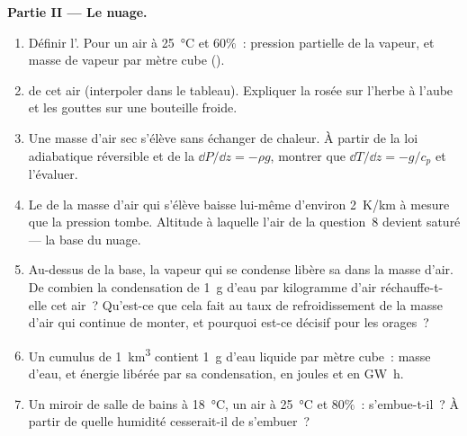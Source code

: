 \begin{problem}
\medskip
\noindent\textbf{Partie II --- Le nuage.}
\begin{enumerate}[resume]
  \item Définir l'. Pour un air à \qty{25}{\degreeCelsius} et $60\%$~:
        pression partielle de la vapeur, et masse de vapeur par mètre cube
        ().
  \item {} de cet air (interpoler dans le tableau). Expliquer la
        rosée sur l'herbe à l'aube et les gouttes sur une bouteille froide.
  \item Une masse d'air sec s'élève sans échanger de chaleur. À partir de la
        loi adiabatique réversible et de la 
        $\dd P/\dd z = -\rho g$, montrer que $\dd T/\dd z = -g/c_p$ et
        l'évaluer.
  \item Le  de la masse d'air qui s'élève baisse lui-même
        d'environ \qty{2}{K/km} à mesure que la pression tombe. Altitude à
        laquelle l'air de la question~8 devient saturé --- la base du nuage.
  \item Au-dessus de la base, la vapeur qui se condense libère sa  dans la masse d'air. De combien la condensation de \qty{1}{g}
        d'eau par kilogramme d'air réchauffe-t-elle cet air~? Qu'est-ce que
        cela fait au taux de refroidissement de la masse d'air qui continue de
        monter, et pourquoi est-ce décisif pour les orages~?
  \item Un cumulus de \qty{1}{km^3} contient \qty{1}{g} d'eau liquide par mètre
        cube~: masse d'eau, et énergie libérée par sa condensation, en joules
        et en \unit{GW h}.
  \item Un miroir de salle de bains à \qty{18}{\degreeCelsius}, un air à
        \qty{25}{\degreeCelsius} et $80\%$~: s'embue-t-il~? À partir de quelle
        humidité cesserait-il de s'embuer~?
\end{enumerate}


\end{problem}
